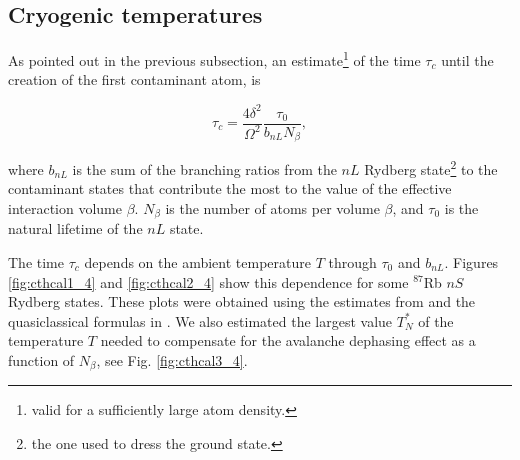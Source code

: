 \documentclass[10pt,twocolumn]{article}
\begin{document}
\subsection*{Cryogenic temperatures}

As pointed out in the previous subsection, an estimate\footnote{valid for a sufficiently large atom density.} of the time $\tau_c$ until the creation of the first contaminant atom, is \cite{AB}

\begin{displaymath}
\tau_c = \frac{4\delta^2}{\Omega^2}\frac{\tau_0}{b_{nL}N_{\beta}},
\end{displaymath}

\noindent
where $b_{nL}$ is the sum of the branching ratios from the $nL$ Rydberg state\footnote{the one used to dress the ground state.} to the contaminant states that contribute the most to the value of the effective interaction volume $\beta$. $N_{\beta}$ is the number of atoms per volume $\beta$, and $\tau_0$ is the natural lifetime of the  $nL$  state.

The time $\tau_c$ depends on the ambient temperature $T$ through $\tau_0$ and $b_{nL}$. Figures \ref{fig:cthcal1_4} and \ref{fig:cthcal2_4} show this dependence for some $^{87}$Rb $nS$ Rydberg states. These plots were obtained using the estimates from \cite{Beterov2009} and the quasiclassical formulas in \cite{Dyachkov1994}. We also estimated the largest value $T_N^*$ of the temperature $T$ needed to compensate for the avalanche dephasing effect as a function of $N_{\beta}$, see Fig. \ref{fig:cthcal3_4}.
\end{document}
